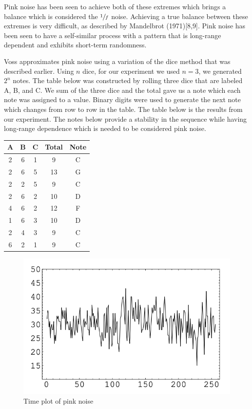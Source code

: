 \documentclass{article}
\begin{document}
Pink noise has been seen to achieve both of these extremes which brings a
balance which is considered the $\sfrac 1 f$ noise\cite{1}. Achieving a true balance
between these extremes is very difficult, as described by Mandelbrot (1971)[8,9].
Pink noise has been seen to have a self-similar process with a pattern that is
long-range dependent and exhibits short-term randomness.

Voss approximates pink noise using a variation of the dice method that was
described earlier. Using $n$ dice, for our experiment we used $n=3$, we generated
$2^{n}$ notes. The table below was constructed by rolling three dice that are
labeled A, B, and C. We sum of the three dice and the total gave us a note which
each note was assigned to a value. Binary digits were used to generate the next
note which changes from row to row in the table. The table below is the results
from our experiment. The notes below provide a stability in the sequence while
having long-range dependence which is needed to be considered pink noise.

\begin{center}
    \begin{tabu}{ccccc}
        A & B & C & Total & Note \\
         & 6 & 1 & 9     & C \\
        2 & 6 & 5 & 13    & G \\
        2 & 2 & 5 & 9     & C \\
        2 & 6 & 2 & 10    & D \\
        4 & 6 & 2 & 12    & F \\
        1 & 6 & 3 & 10    & D \\
        2 & 4 & 3 & 9     & C \\
        6 & 2 & 1 & 9     & C
    \end{tabu}
\end{center}

\begin{figure}[ht!]
    \centering
    \includegraphics[width=\linewidth]{figures/pink_noise_time.png}
    \caption{%
        Time plot of pink noise\cite{8}
    }\label{fig:pink_t}
\end{figure}
\end{document}
